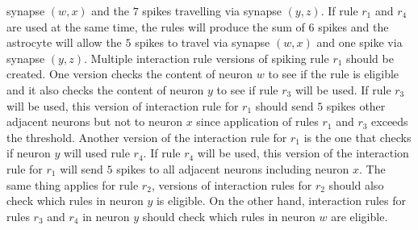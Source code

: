 \documentclass[a4paper]{article}
\theoremstyle{definition}
\begin{document}
synapse $(w,x)$ and the $7$ spikes travelling via synapse $(y,z)$. If rule $r_1$ and $r_4$ are used
at the same time, the rules will produce the sum of $6$ spikes and the astrocyte will allow the
$5$ spikes to travel via synapse $(w,x)$ and one spike via synapse $(y,z)$. Multiple interaction 
rule versions of spiking rule $r_1$ should be created. One version checks the content of neuron 
$w$ to see if the rule is eligible and it also checks the content of neuron $y$ to see if rule $r_3$
will be used. If rule $r_3$ will be used, this version of interaction rule for $r_1$ should send 
$5$ spikes other adjacent neurons but not to neuron $x$ since application of rules $r_1$ and $r_3$
exceeds the threshold. Another version of the interaction rule for $r_1$ is the one that checks if
neuron $y$ will used rule $r_4$. If rule $r_4$ will be used, this version of the interaction rule
for $r_1$ will send $5$ spikes to all adjacent neurons including neuron $x$. The same thing applies
for rule $r_2$, versions of interaction rules for $r_2$ should also check which rules in neuron $y$
is eligible. On the other hand, interaction rules for rules $r_3$ and $r_4$ in neuron $y$ should 
check which rules in neuron $w$ are eligible.
\end{document}

